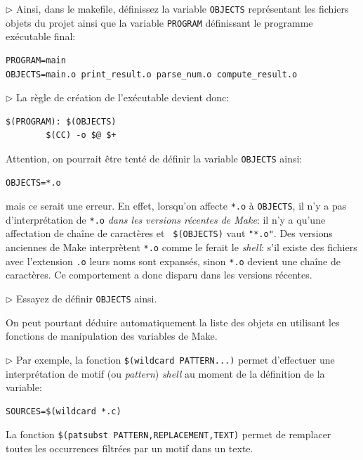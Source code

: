 \documentclass[11pt,a4paper]{article}
\newcommand{\must}{\noindent $\triangleright$ \xspace}
\begin{document}
\medskip

\must Ainsi, dans le makefile, définissez la variable
\texttt{\small OBJECTS} représentant les fichiers objets du projet
ainsi que la variable \texttt{\small PROGRAM} définissant le programme
exécutable final:
{\small
\begin{verbatim}
PROGRAM=main
OBJECTS=main.o print_result.o parse_num.o compute_result.o
\end{verbatim}
}

\must La règle de création de l'exécutable devient donc:
{\small
\begin{verbatim}
$(PROGRAM): $(OBJECTS)
        $(CC) -o $@ $+
\end{verbatim}
}

\noindent Attention, on pourrait être tenté de définir la variable
\texttt{\small OBJECTS}  ainsi:
{\small
\begin{verbatim}
OBJECTS=*.o
\end{verbatim}
}

\noindent mais ce serait une erreur. En effet, lorsqu'on affecte
\texttt{*.o} à \texttt{\small OBJECTS}, il n'y a pas d'interprétation
de \texttt{*.o} \emph{dans les versions récentes de \textsf{Make}}: il
n'y a qu'une affectation de chaîne de caractères et \texttt{\small
\$(OBJECTS)} vaut \texttt{\small "*.o"}. Des versions anciennes de
\textsf{Make} interprètent \texttt{*.o} comme le ferait le
\emph{shell}: s'il existe des fichiers avec l'extension \texttt{.o}
leurs noms sont expansés, sinon \texttt{*.o} devient une chaîne de
caractères. Ce comportement a donc disparu dans les versions récentes.

\medskip

\must Essayez de définir \texttt{\small OBJECTS} ainsi.

\medskip

\noindent On peut pourtant déduire automatiquement la liste des objets
en utilisant les fonctions de manipulation des variables de
\textsf{Make}.

\medskip

\must Par exemple, la fonction {\small \verb!$(wildcard PATTERN...)!}
permet d'effectuer une interprétation de motif (ou \emph{pattern})
\emph{shell} au moment de la définition de la variable:
{\small
\begin{verbatim}
SOURCES=$(wildcard *.c)
\end{verbatim}
}

\noindent La fonction {\small
\verb!$(patsubst PATTERN,REPLACEMENT,TEXT)!}  permet de remplacer
toutes les occurrences filtrées par un motif dans un texte.
\end{document}
